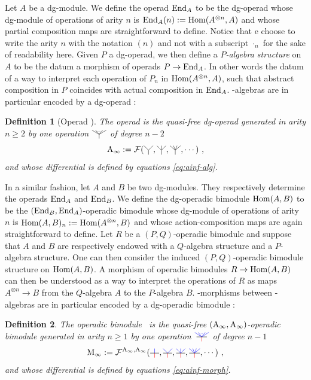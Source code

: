 \documentclass[twoside, 12pt]{amsart}
\newtheorem{definition}{Definition}[section]
\theoremstyle{remark}
\begin{document}
Let $A$ be a dg-module. We define the operad $\mathrm{End}_A$ to be the dg-operad whose dg-module of operations of arity $n$ is $\mathrm{End}_A(n) := \mathrm{Hom} (A^{\otimes n},A)$ and whose partial composition maps are straightforward to define.
Notice that e choose to write the arity $n$ with the notation $(n)$ and not with a subscript $\cdot_n$ for the sake of readability here.
Given $P$ a dg-operad, we then define a \emph{$P$-algebra structure} on $A$ to be the datum a morphism of operads $P \rightarrow \mathrm{End}_A$. In other words the datum of a way to interpret each operation of $P_n$ in $\mathrm{Hom} (A^{\otimes n},A)$, such that abstract composition in $P$ coincides with actual composition in $\mathrm{End}_A$.
\Ainf -algebras are in particular encoded by a dg-operad : 

\begin{definition}[Operad \Ainf]
The \emph{operad \Ainf} is the quasi-free dg-operad generated in arity $n \geqslant 2$ by one operation $\arbreop{0.15}$ of degree $n-2$ 
\[ \Ainf := \mathcal{F}( \arbreopdeux , \arbreoptrois, \arbreopquatre , \cdots ) \ , \]
and whose differential is defined by equations \ref{eq:ainf-alg}.
\end{definition}

In a similar fashion, let $A$ and $B$ be two dg-modules. They respectively determine the operads $\mathrm{End}_A$ and $ \mathrm{End}_B$. We define the dg-operadic bimodule $\mathrm{Hom} (A ,B)$ to be the $(\mathrm{End}_B , \mathrm{End}_A)$-operadic bimodule whose dg-module of operations of arity $n$ is $ \mathrm{Hom} (A ,B)_n := \mathrm{Hom} (A^{\otimes n},B)$ and whose action-composition maps are again straightforward to define.
Let $R$ be a $(P,Q)$-operadic bimodule and suppose that $A$ and $B$ are respectively endowed with a $Q$-algebra structure and a $P$-algebra structure. One can then consider the induced $(P,Q)$-operadic bimodule structure on $\mathrm{Hom} (A ,B)$. A morphism of operadic bimodules $R \rightarrow \mathrm{Hom} (A ,B)$ can then be understood as a way to interpret the operations of $R$ as maps $A^{\otimes n} \rightarrow B$ from the $Q$-algebra $A$ to the $P$-algebra $B$. \Ainf -morphisms between \Ainf -algebras are in particular encoded by a dg-operadic bimodule :

\begin{definition}
The operadic bimodule \Minf\ is the quasi-free $(\mathrm{A}_\infty ,\mathrm{A}_\infty )$-operadic bimodule generated in arity $n \geqslant 1$ by one operation $\arbreopmorph{0.15}$ of degree $n-1$ 
\[ \Minf :=  \mathcal{F}^{\Ainf , \Ainf}(\arbreopunmorph , \arbreopdeuxmorph , \arbreoptroismorph , \arbreopquatremorph , \cdots ) \ , \]
and whose differential is defined by equations \ref{eq:ainf-morph}.
\end{definition}
\end{document}
